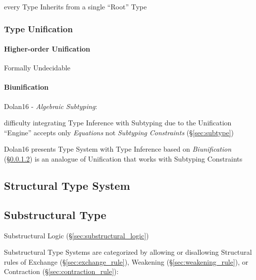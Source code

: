 every Type Inherits from a single ``Root'' Type



\subsubsection{Type Unification}\label{sec:type_unification}




\paragraph{Higher-order Unification}
\label{sec:higherorder_unification}\hfill

Formally Undecidable



\paragraph{Biunification}\label{sec:biunification}\hfill

Dolan16 - \emph{Algebraic Subtyping}:

difficulty integrating Type Inference with Subtyping due to the
Unification ``Engine'' accepts only \emph{Equations} not
\emph{Subtyping Constraints} (\S\ref{sec:subtype})

Dolan16 presents Type System with Type Inference based on
\emph{Biunification} (\S\ref{sec:biunification}) is an analogue of
Unification that works with Subtyping Constraints



\subsection{Structural Type System}\label{sec:structural_type_system}

\subsection{Substructural Type}
\label{sec:substructural_type}

Substructural Logic (\S\ref{sec:substructural_logic})

Substructural Type Systems are categorized by allowing or disallowing
Structural rules of Exchange (\S\ref{sec:exchange_rule}), Weakening
(\S\ref{sec:weakening_rule}), or Contraction
(\S\ref{sec:contraction_rule}):

